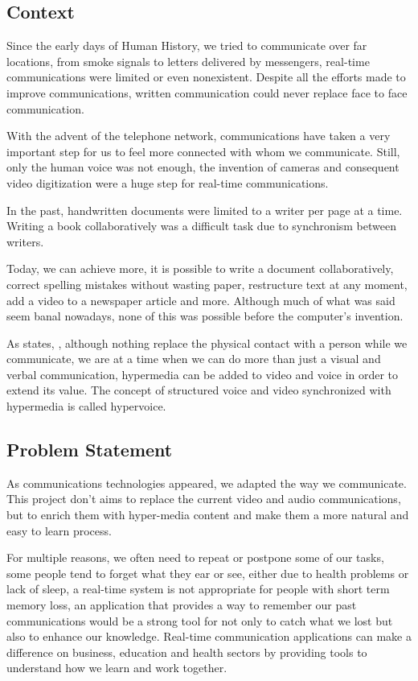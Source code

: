 \subsection{Context}   %
 	Since the early days of Human History, we tried to communicate over far locations, from smoke signals to letters delivered by messengers, real-time communications were limited or even nonexistent. Despite all the efforts made to improve communications, written communication could never replace face to face communication.

	With the advent of the telephone network, communications have taken a very important step for us to feel more connected with whom we communicate. Still, only the human voice was not enough, the invention of cameras and consequent video digitization were a huge step for real-time communications.

	In the past, handwritten documents were limited to a writer per page at a time. Writing a book collaboratively was a difficult task due to synchronism between writers.

	Today, we can achieve more, it is possible to write a document collaboratively, correct spelling mistakes without wasting paper, restructure text at any moment, add a video to a newspaper article and more. Although much of what was said seem banal nowadays, none of this was possible before the computer's invention. 

	As \cite{geddes} states,  , although nothing replace the physical contact with a person while we communicate, we are at a time when we can do more than just a visual and verbal communication, hypermedia can be added to video and voice in order to extend its value. The concept of structured voice and video synchronized with hypermedia is called hypervoice.

\subsection{Problem Statement} %

	As communications technologies appeared, we adapted the way we communicate. This project don't aims to replace the current video and audio communications, but to enrich them with hyper-media content and make them a more natural and easy to learn process. 

	For multiple reasons, we often need to repeat or postpone some of our tasks, some people tend to forget what they ear or see, either due to health problems or lack of sleep, a real-time system is not appropriate for people with short term memory loss, an application that provides a way to remember our past communications would be a strong tool for not only to catch what we lost but also to enhance our knowledge. Real-time communication applications can make a difference on business, education and health sectors by providing tools to understand how we learn and work together.

